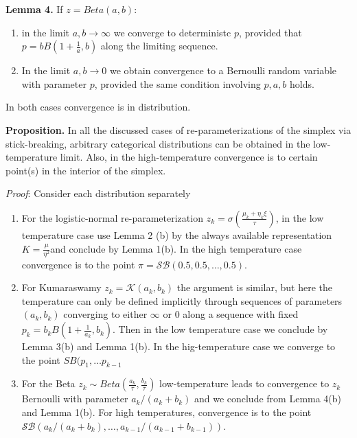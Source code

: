 \documentclass[twoside]{article}
\begin{document}
\textbf{Lemma 4.} If $z=Beta(a,b)$: \begin{enumerate}
\item in the limit $a,b \rightarrow \infty $  we converge to deterministc $p$, provided that $p=bB\left(1+\frac{1}{a},b\right)$ along the limiting sequence.
\item In the limit $a,b\rightarrow 0$ we obtain convergence to a Bernoulli random variable with parameter $p$, provided the same condition involving $p,a,b$ holds. 
\end{enumerate}
In both cases convergence is in distribution.

\textbf{Proposition.} In all the discussed cases of re-parameterizations of the simplex via stick-breaking, arbitrary categorical distributions can be obtained in the low-temperature limit. Also, in the high-temperature convergence is to certain point(s) in the interior of the simplex.

\textit{Proof}: Consider each distribution separately
\begin{enumerate}
\item For the logistic-normal re-parameterization $z_k = \sigma\left( \frac{\mu_k+\eta_k\xi}{\tau}\right)$, in the low temperature case use Lemma 2 (b) by the always available representation  $K= \frac{\mu}{\eta^2}$and conclude by Lemma 1(b). In the high temperature case convergence is to the point $\pi = \mathcal{SB}(0.5,0.5,\ldots, 0.5)$.
\item For Kumaraswamy $z_k=\mathcal{K}(a_k,b_k)$ the argument is similar, but here the temperature can only be defined implicitly through sequences of parameters $(a_k,b_k)$ converging to either $\infty$ or 0 along a sequence with fixed $p_k=b_kB\left(1+\frac{1}{a_k},b_k\right)$. Then in the low temperature case we conclude by Lemma 3(b) and Lemma 1(b). In the hig-temperature case we converge to the point $SB(p_1,\ldots p_{k-1}$
\item For the Beta $z_k\sim Beta(\frac{a_k}{\tau},\frac{b_k}{\tau})$ low-temperature leads to convergence to $z_k$ Bernoulli with parameter $a_k/(a_k+b_k)$ and we conclude from Lemma 4(b) and Lemma 1(b). For high temperatures, convergence is to the point $\mathcal{SB}(a_k/(a_k+b_k),\ldots,a_{k-1}/(a_{k-1}+b_{k-1}))$.  \end{enumerate}


\end{document}
